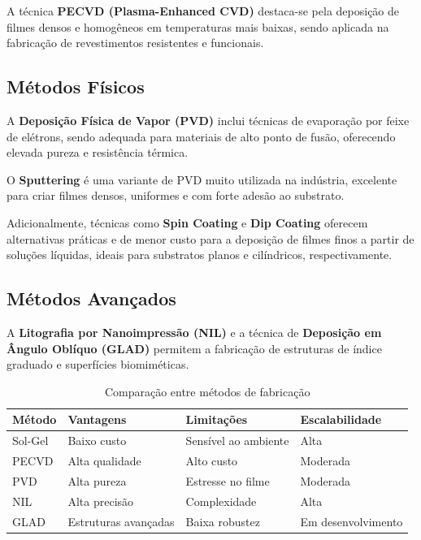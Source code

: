 \documentclass[12pt]{article}
\begin{document}
A técnica \textbf{PECVD (Plasma-Enhanced CVD)} destaca-se pela deposição de filmes densos e homogêneos em temperaturas mais baixas, sendo aplicada na fabricação de revestimentos resistentes e funcionais.

\subsection{Métodos Físicos}

A \textbf{Deposição Física de Vapor (PVD)} inclui técnicas de evaporação por feixe de elétrons, sendo adequada para materiais de alto ponto de fusão, oferecendo elevada pureza e resistência térmica.

O \textbf{Sputtering} é uma variante de PVD muito utilizada na indústria, excelente para criar filmes densos, uniformes e com forte adesão ao substrato.

Adicionalmente, técnicas como \textbf{Spin Coating} e \textbf{Dip Coating} oferecem alternativas práticas e de menor custo para a deposição de filmes finos a partir de soluções líquidas, ideais para substratos planos e cilíndricos, respectivamente.

\subsection{Métodos Avançados}

A \textbf{Litografia por Nanoimpressão (NIL)} e a técnica de \textbf{Deposição em Ângulo Oblíquo (GLAD)} permitem a fabricação de estruturas de índice graduado e superfícies biomiméticas.

\begin{table}[H]
\centering
\caption{Comparação entre métodos de fabricação}
\label{tab:metodos}

\vspace{0.2cm}

\begin{tabular}{llll}
\toprule
\textbf{Método} & \textbf{Vantagens} & \textbf{Limitações} & \textbf{Escalabilidade} \\
\midrule
Sol-Gel & Baixo custo & Sensível ao ambiente & Alta \\
PECVD & Alta qualidade & Alto custo & Moderada \\
PVD & Alta pureza & Estresse no filme & Moderada \\
NIL & Alta precisão & Complexidade & Alta \\
GLAD & Estruturas avançadas & Baixa robustez & Em desenvolvimento \\
\bottomrule
\end{tabular}
\end{table}
\end{document}
